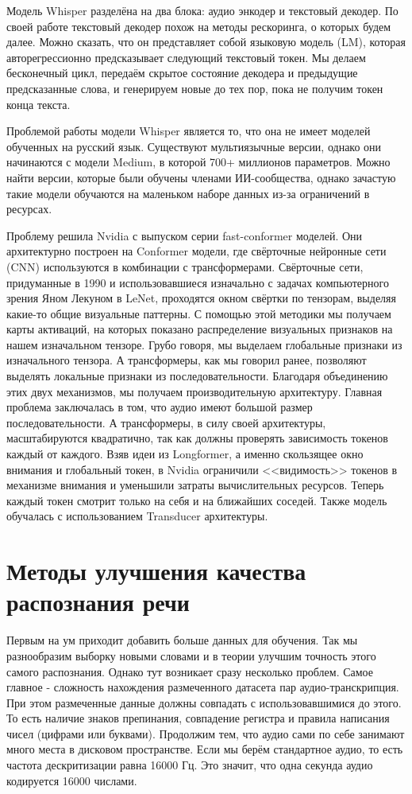 Модель Whisper разделёна на два блока: аудио энкодер и текстовый декодер.
По своей работе текстовый декодер похож на методы рескоринга, о которых будем далее.
Можно сказать, что он представляет собой языковую модель (LM), которая авторегрессионно предсказывает следующий текстовый токен.
Мы делаем бесконечный цикл, передаём скрытое состояние декодера и предыдущие предсказанные слова, и генерируем новые до тех пор, пока не получим токен конца текста.

Проблемой работы модели Whisper является то, что она не имеет моделей обученных на русский язык.
Существуют мультиязычные версии, однако они начинаются с модели Medium, в которой 700+ миллионов параметров.
Можно найти версии, которые были обучены членами ИИ-сообщества, однако зачастую такие модели обучаются на маленьком наборе данных из-за ограничений в ресурсах.

Проблему решила Nvidia с выпуском серии fast-conformer моделей. 
Они архитектурно построен на Conformer модели, где свёрточные нейронные сети (CNN) используются в комбинации с трансформерами.
Свёрточные сети, придуманные в 1990 и использовавшиеся изначально с задачах компьютерного зрения Яном Лекуном в LeNet, проходятся окном свёртки по тензорам, выделяя какие-то общие визуальные паттерны.
С помощью этой методики мы получаем карты активаций, на которых показано распределение визуальных признаков на нашем изначальном тензоре.
Грубо говоря, мы выделаем глобальные признаки из изначального тензора.
А трансформеры, как мы говорил ранее, позволяют выделять локальные признаки из последовательности.
Благодаря объединению этих двух механизмов, мы получаем производительную архитектуру.
Главная проблема заключалась в том, что аудио имеют большой размер последовательности.
А трансформеры, в силу своей архитектуры, масштабируются квадратично, так как должны проверять зависимость токенов каждый от каждого.
Взяв идеи из Longformer, а именно скользящее окно внимания и глобальный токен, в Nvidia ограничили <<видимость>> токенов в механизме внимания и уменьшили затраты вычислительных ресурсов.
Теперь каждый токен смотрит только на себя и на ближайших соседей.
Также модель обучалась с использованием Transducer архитектуры.

\section{Методы улучшения качества распознания речи}
Первым на ум приходит добавить больше данных для обучения.
Так мы разнообразим выборку новыми словами и в теории улучшим точность этого самого распознания.
Однако тут возникает сразу несколько проблем. Самое главное - сложность нахождения размеченного датасета пар аудио-транскрипция.
При этом размеченные данные должны совпадать с использовавшимися до этого.
То есть наличие знаков препинания, совпадение регистра и правила написания чисел (цифрами или буквами).
Продолжим тем, что аудио сами по себе занимают много места в дисковом пространстве.
Если мы берём стандартное аудио, то есть частота дескритизации равна 16000 Гц.
Это значит, что одна секунда аудио кодируется 16000 числами.

